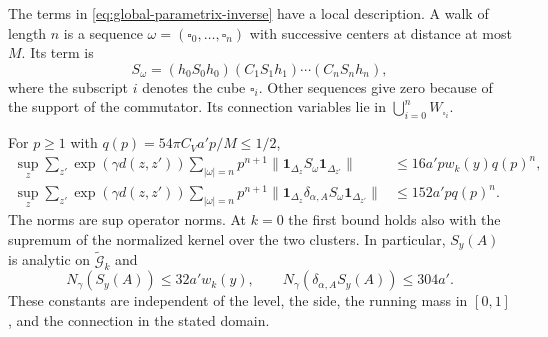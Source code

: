 The terms in \eqref{eq:global-parametrix-inverse} have a local
description. A walk of length $n$ is a sequence
$\omega=(\square_0,\ldots,\square_n)$ with successive centers at
distance at most $M$. Its term is
\[
 S_\omega=(h_0S_0h_0)(C_1S_1h_1)\cdots(C_nS_nh_n),
\]
where the subscript $i$ denotes the cube $\square_i$.
Other sequences give zero because of the support of the commutator.
Its connection variables lie in
$\bigcup_{i=0}^nW_{\square_i}$.

\begin{proposition}\label{prop:walk-propagator-bounds}
For $p\ge1$ with $q(p)=54\pi C_Va'p/M\le1/2$,
\begin{align}
 \sup_z\sum_{z'}\exp(\gamma d(z,z'))
       \sum_{|\omega|=n}p^{n+1}
           \|\mathbf1_{\Delta_z}S_\omega\mathbf1_{\Delta_{z'}}\|
       &\le16a'pw_k(y)q(p)^n,\label{eq:walk-row-bound}\\
 \sup_z\sum_{z'}\exp(\gamma d(z,z'))
       \sum_{|\omega|=n}p^{n+1}
           \|\mathbf1_{\Delta_z}\delta_{\alpha,A}S_\omega
                            \mathbf1_{\Delta_{z'}}\|
       &\le152a'pq(p)^n.\label{eq:walk-holder-bound}
\end{align}
The norms are sup operator norms. At $k=0$ the first bound holds
also with the supremum of the normalized kernel over the two clusters.
In particular, $S_y(A)$ is analytic on $\widetilde{\mathcal G}_k$ and
\begin{equation}\label{eq:global-propagator-bounds}
 N_\gamma(S_y(A))\le32a'w_k(y),\qquad
 N_\gamma(\delta_{\alpha,A}S_y(A))\le304a'.
\end{equation}
These constants are independent of the level, the side, the running
mass in $[0,1]$, and the connection in the stated domain.
\end{proposition}

